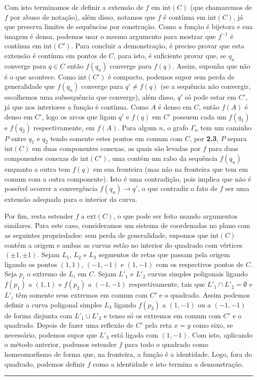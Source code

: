 \documentclass[12pt,a4paper]{article}
\def\eop{\hfill\rule{2.5mm}{2.5mm} \\ }
\theoremstyle{definition}
\begin{document}
Com isto terminamos de definir a extensão de $f$ em $\overline{\text{int}}(C)$ (que chamaremos de $f$ por abuso de notação), além disso, notamos que $f$ é contínua em $\text{int}(C)$, já que preserva limites de sequências por construção. Como a função é bijetora e sua imagem é densa, podemos usar o mesmo argumento para mostrar que $f^{-1}$ é contínua em $\text{int}(C')$. Para concluir a demonstração, é preciso provar que esta extensão é contínua em pontos de $C$, para isto, é suficiente provar que, se $q_n$ converge para $q\in C$ então $f(q_n)$ converge para $f(q)$. Assim, suponha que não é o que acontece. Como $\overline{\text{int}}(C')$ é compacto, podemos supor sem perda de generalidade que $f(q_n)$ converge para $q'\neq f(q)$ (se a sequência não convergir, escolhemos uma subsequência que converge), além disso, $q'$ só pode estar em $C'$, já que nos interiores a função é contínua. Como $A$ é denso em $C$, então $f(A)$ é denso em $C'$, logo os arcos que ligam $q'$ e $f(q)$ em $C'$ possuem cada um $f(q_1)$ e $f(q_2)$ respectivamente, em $f(A)$. Para algum $n$, o grafo $\Gamma_n$ tem um caminho $P$ entre $q_1$ e $q_2$ tendo somente estes pontos em comum com $C$, por \textbf{2.3}, $P$ separa $\text{int}(C)$ em duas componentes conexas, as quais são levadas por $f$ para duas componentes conexas de $\text{int}(C')$, uma contém um rabo da sequência $f(q_n)$ enquanto a outra tem $f(q)$ em sua fronteira (mas não na fronteira que tem em comum com a outra componente). Isto é uma contradição, pois implica que não é possível ocorrer a convergência $f(q_n)\rightarrow q'$, o que contradiz o fato de $f$ ser uma extensão adequada para o interior da curva. 
 
Por fim, resta estender $f$ a $\text{ext}(C)$, o que pode ser feito usando argumentos similares. Para este caso, consideramos um sistema de coordenadas no plano com as seguintes propriedades: sem perda de generalidade, supomos que $\text{int}(C)$ contém a origem e ambas as curvas estão no interior do quadrado com vértices $(\pm 1 , \pm 1)$. Sejam $L_1$, $L_2$ e $L_3$ segmentos de retas que passam pela origem ligando os pontos $(1,1)$, $(-1,-1)$ e $(1,-1)$ com os respectivos pontos de $C$. Seja $p_i$ o extremo de $L_i$ em $C$. Sejam $L'_1$ e $L'_2$ curvas simples poligonais ligando $f(p_1)$ a $(1,1)$ e $f(p_2)$ a $(-1,-1)$ respectivamente, tais que $L'_1\cap L'_2 = \emptyset$ e $L'_i$ têm somente seus extremos em comum com $C'$ e o quadrado. Assim podemos definir a curva poligonal simples $L_3$ ligando $f(p_3)$ a $(1,-1)$ ou a $(-1,-1)$ de forma disjunta com $L'_1\cup L'_2$ e tenso só os extremos em comum com $C'$ e o quadrado. Depois de fazer uma reflexão de $C'$ pela reta $x=y$ como eixo, se necessário, podemos supor que $L'_3$ está ligada com $(1,-1)$. Com isto, aplicando o método anterior, podemos estender $f$ para todo o quadrado como homeomorfismo de forma que, na fronteira, a função é a identidade. Logo, fora do quadrado, podemos definir $f$ como a identidade e isto termina a demonstração. \eop  
 
\end{document}
